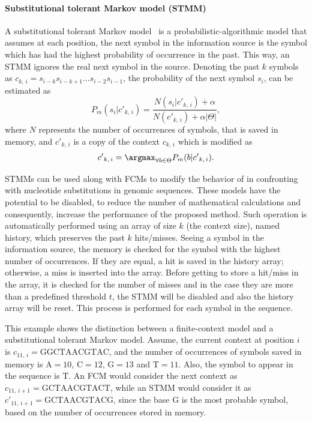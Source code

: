 \paragraph{Substitutional tolerant Markov model (STMM)}
A substitutional tolerant Markov model~\cite{pratas2017substitutional} is a probabilistic-algorithmic model that assumes at each position, the next symbol in the information source is the symbol which has had the highest probability of occurrence in the past. This way, an STMM ignores the real next symbol in the source. Denoting the past $k$ symbols as $c_{k,\,i} = s_{i-k} s_{i-k+1}\ldots s_{i-2} s_{i-1}$, the probability of the next symbol $s_i$, can be estimated as
\begin{equation}
  P_m(s_i|{c'}_{k,\,i}) = \frac{N(s_i|{c'}_{k,\,i})+\alpha}{N({c'}_{k,\,i})+ \alpha|\Theta|},
\end{equation}
where $N$ represents the number of occurrences of symbols, that is saved in memory, and ${c'}_{k,\,i}$ is a copy of the context $c_{k,\,i}$ which is modified as
\begin{equation}
  {c'}_{k,\,i} = \argmax_{\forall b\in \Theta}{P_m(b|{c'}_{k,\,i})}.
\end{equation}

STMMs can be used along with FCMs to modify the behavior of \smashpp in confronting with nucleotide substitutions in genomic sequences. These models have the potential to be disabled, to reduce the number of mathematical calculations and consequently, increase the performance of the proposed method. Such operation is automatically performed using an array of size $k$ (the context size), named history, which preserves the past $k$ hits/misses. Seeing a symbol in the information source, the memory is checked for the symbol with the highest number of occurrences. If they are equal, a hit is saved in the history array; otherwise, a miss is inserted into the array. Before getting to store a hit/miss in the array, it is checked for the number of misses and in the case they are more than a predefined threshold $t$, the STMM will be disabled and also the history array will be reset. This process is performed for each symbol in the sequence.

This example shows the distinction between a finite-context model and a substitutional tolerant Markov model. Assume, the current context at position $i$ is $c_{11,\,i}=\textrm{GGCTAACGTAC}$, and the number of occurrences of symbols saved in memory is $\textrm{A}=10$, $\textrm{C}=12$, $\textrm{G}=13$ and $\textrm{T}=11$. Also, the symbol to appear in the sequence is $\textrm{T}$. An FCM would consider the next context as $c_{11,\,i+1}=\textrm{GCTAACGTACT}$, while an STMM would consider it as ${c'}_{11,\,i+1}=\textrm{GCTAACGTACG}$, since the base $\textrm{G}$ is the most probable symbol, based on the number of occurrences stored in memory.

